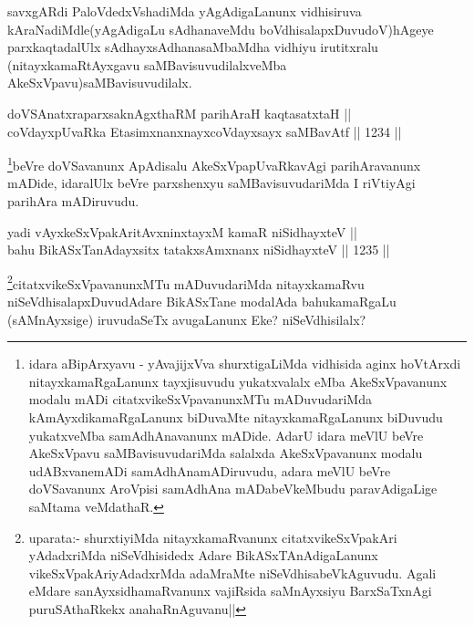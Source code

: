 \begin{artha}
savxgARdi PaloVdedxVshadiMda yAgAdigaLanunx vidhisiruva kAraNadiMdle(yAgAdigaLu sAdhanaveMdu boVdhisalapxDuvudoV)hAgeye parxkaqtadalUlx sAdhayxsAdhanasaMbaMdha vidhiyu irutitxralu (nitayxkamaRtAyxgavu saMBavisuvudilalxveMba AkeSxVpavu)saMBavisuvudilalx.
\end{artha}


\begin{shl}
doVSAnatxraparxsaknAgxthaRM parihAraH kaqtasatxtaH || \\
coVdayxpUvaRka EtasimxnanxnayxcoVdayxsayx saMBavAtf ||  1234 ||   
\end{shl}

\begin{artha}
\footnote{idara aBipArxyavu - yAvajijxVva shurxtigaLiMda vidhisida aginx hoVtArxdi nitayxkamaRgaLanunx tayxjisuvudu yukatxvalalx eMba AkeSxVpavanunx modalu mADi citatxvikeSxVpavanunxMTu mADuvudariMda kAmAyxdikamaRgaLanunx biDuvaMte nitayxkamaRgaLanunx biDuvudu yukatxveMba samAdhAnavanunx mADide. AdarU idara meVlU beVre AkeSxVpavu saMBavisuvudariMda salalxda AkeSxVpavanunx modalu udABxvanemADi samAdhAnamADiruvudu, adara meVlU beVre doVSavanunx AroVpisi samAdhAna mADabeVkeMbudu  paravAdigaLige saMtama veMdathaR.}beVre doVSavanunx ApAdisalu AkeSxVpapUvaRkavAgi parihAravanunx mADide, idaralUlx beVre parxshenxyu saMBavisuvudariMda I riVtiyAgi parihAra mADiruvudu.
\end{artha}


\begin{shl}
yadi vAyxkeSxVpakAritAvxninxtayxM kamaR niSidhayxteV || \\
bahu BikASxTanAdayxsitx tatakxsAmxnanx niSidhayxteV ||  1235 ||  
\end{shl}

\begin{artha}
\footnote{uparata:- shurxtiyiMda nitayxkamaRvanunx citatxvikeSxVpakAri yAdadxriMda niSeVdhisidedx Adare BikASxTAnAdigaLanunx vikeSxVpakAriyAdadxrMda  adaMraMte niSeVdhisabeVkAguvudu. Agali eMdare sanAyxsidhamaRvanunx vajiRsida saMnAyxsiyu BarxSaTxnAgi puruSAthaRkekx anahaRnAguvanu||}citatxvikeSxVpavanunxMTu mADuvudariMda nitayxkamaRvu niSeVdhisalapxDuvudAdare BikASxTane modalAda bahukamaRgaLu (sAMnAyxsige) iruvudaSeTx avugaLanunx Eke? niSeVdhisilalx?
\end{artha}


